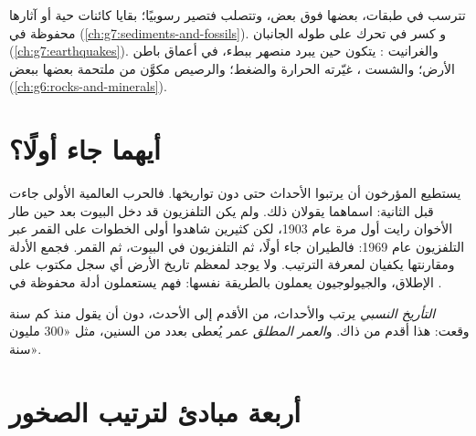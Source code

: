 \begin{recall}
تترسب  في طبقات، بعضها فوق بعض، وتتصلب فتصير  رسوبيًا؛ 
بقايا كائنات حية أو آثارها محفوظة في  (\cref{ch:g7:sediments-and-fossils}).
و\emph{} كسر في  تحرك على طوله الجانبان
(\cref{ch:g7:earthquakes}). والغرانيت \emph{}: يتكون حين يبرد 
منصهر ببطء، في أعماق باطن الأرض؛ والشست \emph{}، غيّرته الحرارة
والضغط؛ والرصيص  مكوَّن من  ملتحمة بعضها ببعض
(\cref{ch:g6:rocks-and-minerals}).
\end{recall}

\section{أيهما جاء أولًا؟}

يستطيع المؤرخون أن يرتبوا الأحداث حتى دون تواريخها. فالحرب العالمية الأولى
جاءت قبل الثانية: اسماهما يقولان ذلك. ولم يكن التلفزيون قد دخل البيوت بعد
حين طار الأخوان رايت أول مرة عام 1903، لكن كثيرين شاهدوا أولى الخطوات على
القمر عبر التلفزيون عام 1969: فالطيران جاء أولًا، ثم التلفزيون في البيوت،
ثم القمر. فجمع الأدلة ومقارنتها يكفيان لمعرفة الترتيب. ولا يوجد لمعظم
تاريخ الأرض أي سجل مكتوب على الإطلاق، والجيولوجيون يعملون بالطريقة نفسها:
فهم يستعملون أدلة محفوظة في .

\begin{definition}\label{def:g7:geological-time:relative-dating}
\emph{التأريخ النسبي} يرتب  والأحداث، من الأقدم
إلى الأحدث، دون أن يقول منذ كم سنة وقعت: هذا  أقدم من ذاك.
و\emph{العمر المطلق} عمر يُعطى بعدد من السنين، مثل
«\num{300} مليون سنة».
\end{definition}

\section{أربعة مبادئ لترتيب الصخور}

